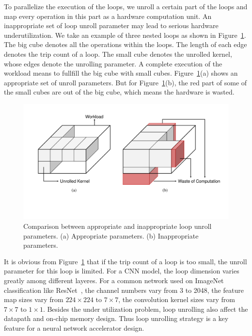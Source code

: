 To parallelize the execution of the loops, we unroll a certain part of the loops and map every operation in this part as a hardware computation unit. An inappropriate set of loop unroll parameter may lead to serious hardware underutilization. We take an example of three nested loops as shown in Figure~\ref{fig:unrolling}. The big cube denotes all the operations within the loops. The length of each edge denotes the trip count of a loop. The small cube denotes the unrolled kernel, whose edges denote the unrolling parameter. A complete execution of the workload means to fullfill the big cube with small cubes. Figure~\ref{fig:unrolling}(a) shows an appropriate set of unroll parameters. But for Figure~\ref{fig:unrolling}(b), the red part of some of the small cubes are out of the big cube, which means the hardware is wasted.

\begin{figure}[ht]
    \centering
    \includegraphics[width=0.8\columnwidth]{fig/unrolling.pdf}
    \caption{Comparison between appropriate and inappropriate loop unroll parameters. (a) Appropriate parameters. (b) Inappropriate parameters.}
    \label{fig:unrolling}
\end{figure}

It is obvious from Figure~\ref{fig:unrolling} that if the trip count of a loop is too small, the unroll parameter for this loop is limited. For a CNN model, the loop dimension varies greatly among different layeres. For a common network used on ImageNet classification like ResNet~\cite{he2016deep}, the channel numbers vary from 3 to 2048, the feature map sizes vary from $224\times 224$ to $7\times 7$, the convolution kernel sizes vary from $7\times 7$ to $1\times 1$. Besides the under utilization problem, loop unrolling also affect the datapath and on-chip memory design. Thus loop unrolling strategy is a key feature for a neural network accelerator design. 

